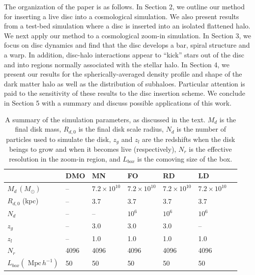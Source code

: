 The organization of the paper is as follows.  In Section 2, we outline
our method for inserting a live disc into a cosmological simulation.
We also present results from a test-bed simulation where a disc is
inserted into an isolated flattened halo.  We next apply our method to
a cosmological zoom-in simulation.  In Section 3, we focus on disc dynamics
and find that the disc develops a bar, spiral structure and a warp.
In addition, disc-halo interactions appear to ``kick'' stars out of
the disc and into regions normally associated with the stellar halo.
In Section 4, we present our results for the spherically-averaged
density profile and shape of the dark matter halo as well as the
distribution of subhaloes.  Particular attention is paid to the
sensitivity of these results to the disc insertion scheme.  We
conclude in Section 5 with a summary and discuss possible applications
of this work.

\begin{table}
\begin{tabular}{l l l l l l l}
\hline
 & DMO & MN & FO & RD & LD\\
\hline
$M_d \, (M_\odot)$ & -- & $7.2 \times 10^{10}$ & $7.2 \times 10^{10}$ & $7.2 \times 10^{10}$ & $7.2 \times 10^{10}$\\
$R_{d,0}$ (kpc) & -- & 3.7 & 3.7 & 3.7 & 3.7\\
$N_d$ & -- & -- & $10^6$& $10^6$ & $10^6$\\
$z_g$ & -- & 3.0 & 3.0 & 3.0 & --\\
$z_l$ & -- & 1.0 & 1.0 & 1.0 & 1.0\\
$N_r$ & 4096 & 4096 & 4096 & 4096 & 4096\\
$L_{box} (\text{ Mpc} \,h^{-1} )$ & 50  & 50 & 50 & 50 & 50\\
\hline
\end{tabular}\caption{A summary of the simulation parameters, as discussed in the text. $M_d$ is the final disk mass, $R_{d,0}$ is the final disk scale radius, $N_d$ is the number of particles used to simulate the disk, $z_g$ and $z_l$ are the redshifts when the disk beings to grow and when it becomes live (respectively), $N_r$ is the effective resolution in the zoom-in region, and $L_{box}$ is the comoving size of the box. } \label{tab:simparams}
\end{table}

